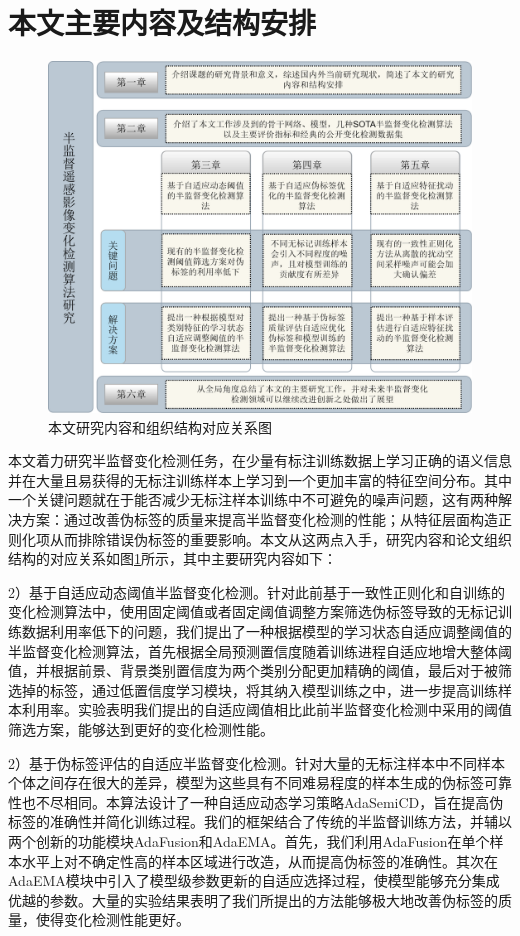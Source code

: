 \documentclass[lang=chs, degree=master, blindreview=false, adobe=false]{yanputhesis}
\begin{document}
\section{本文主要内容及结构安排}
\begin{figure}[!htbp]
  \centering
  \includegraphics[scale=0.8]{images/paper_frame.png}
  \caption{
    本文研究内容和组织结构对应关系图
  }
  \label{fig:paper_frame}
\end{figure}
本文着力研究半监督变化检测任务，在少量有标注训练数据上学习正确的语义信息并在大量且易获得的无标注训练样本上学习到一个更加丰富的特征空间分布。其中一个关键问题就在于能否减少无标注样本训练中不可避免的噪声问题，这有两种解决方案：通过改善伪标签的质量来提高半监督变化检测的性能；从特征层面构造正则化项从而排除错误伪标签的重要影响。本文从这两点入手，研究内容和论文组织结构的对应关系如图\ref{fig:paper_frame}所示，其中主要研究内容如下：

2）基于自适应动态阈值半监督变化检测。针对此前基于一致性正则化和自训练的变化检测算法中，使用固定阈值或者固定阈值调整方案筛选伪标签导致的无标记训练数据利用率低下的问题，我们提出了一种根据模型的学习状态自适应调整阈值的半监督变化检测算法，首先根据全局预测置信度随着训练进程自适应地增大整体阈值，并根据前景、背景类别置信度为两个类别分配更加精确的阈值，最后对于被筛选掉的标签，通过低置信度学习模块，将其纳入模型训练之中，进一步提高训练样本利用率。实验表明我们提出的自适应阈值相比此前半监督变化检测中采用的阈值筛选方案，能够达到更好的变化检测性能。

2）基于伪标签评估的自适应半监督变化检测。针对大量的无标注样本中不同样本个体之间存在很大的差异，模型为这些具有不同难易程度的样本生成的伪标签可靠性也不尽相同。本算法设计了一种自适应动态学习策略AdaSemiCD，旨在提高伪标签的准确性并简化训练过程。我们的框架结合了传统的半监督训练方法，并辅以两个创新的功能模块AdaFusion和AdaEMA。首先，我们利用AdaFusion在单个样本水平上对不确定性高的样本区域进行改造，从而提高伪标签的准确性。其次在AdaEMA模块中引入了模型级参数更新的自适应选择过程，使模型能够充分集成优越的参数。大量的实验结果表明了我们所提出的方法能够极大地改善伪标签的质量，使得变化检测性能更好。
\end{document}
